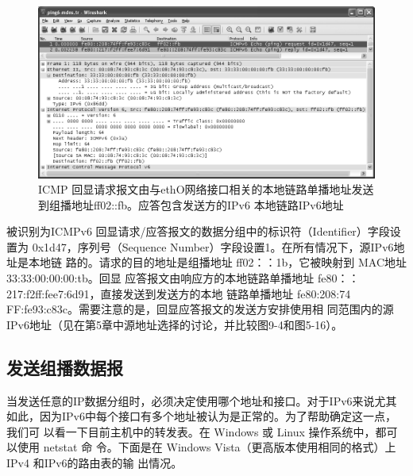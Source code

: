 \begin{figure}[ht]
    \centering
	\includegraphics[width=1\textwidth]{imgs/9/9-4.png}
	\caption{ICMP 回显请求报文由与ethO网络接口相关的本地链路单播地址发送到组播地址ff02::fb。应答包含发送方的IPv6 本地链路IPv6地址}
\end{figure}

被识别为ICMPv6 回显请求/应答报文的数据分组中的标识符（Identifier）字段设置为
0x1d47，序列号（Sequence Number）字段设置1。在所有情况下，源IPv6地址是本地链
路的。请求的目的地址是组播地址 ff02：：1b，它被映射到 MAC地址33:33:00:00:00:tb。回显
应答报文由响应方的本地链路单播地址 fe80：：217:f2ff:fee7:6d91，直接发送到发送方的本地
链路单播地址 fe80:208:74 FF:fe93:c83c。需要注意的是，回显应答报文的发送方安排使用相
同范围内的源 IPv6地址（见在第5章中源地址选择的讨论，并比较图9-4和图5-16）。

\subsection{发送组播数据报}
当发送任意的IP数据分组时，必须决定使用哪个地址和接口。对于IPv6来说尤其
如此，因为IPv6中每个接口有多个地址被认为是正常的。为了帮助确定这一点，我们可
以看一下目前主机中的转发表。在 Windows 或 Linux 操作系统中，都可以使用 netstat 命
令。下面是在 Windows Vista（更高版本使用相同的格式）上IPv4 和IPv6的路由表的输
出情况。

